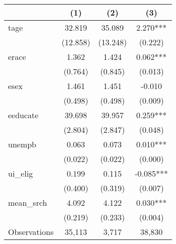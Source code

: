 \begin{tabular}{l*{3}c}
\hline\hline
 & (1) & (2) & (3) \\
\hline
tage&32.819&35.089&2.270***\\
&(12.858)&(13.248)&(0.222)\\
erace&1.362&1.424&0.062***\\
&(0.764)&(0.845)&(0.013)\\
esex&1.461&1.451&-0.010\\
&(0.498)&(0.498)&(0.009)\\
eeducate&39.698&39.957&0.259***\\
&(2.804)&(2.847)&(0.048)\\
unempb&0.063&0.073&0.010***\\
&(0.022)&(0.022)&(0.000)\\
ui\_elig&0.199&0.115&-0.085***\\
&(0.400)&(0.319)&(0.007)\\
mean\_srch&4.092&4.122&0.030***\\
&(0.219)&(0.233)&(0.004)\\
\hline
Observations & 35,113 & 3,717 & 38,830 \\
\hline\hline
\end{tabular}
